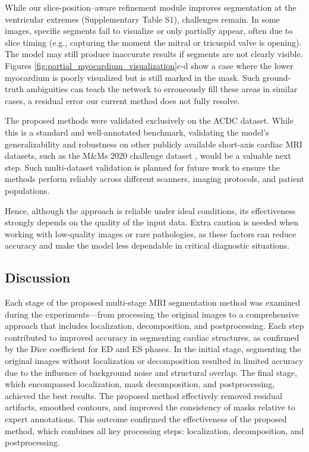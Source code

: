 \documentclass[fleqn,10pt]{wlscirep}
\begin{document}
While our slice-position--aware refinement module improves segmentation at the ventricular extremes (Supplementary Table S1), challenges remain. In some images, specific segments fail to visualize or only partially appear, often due to slice timing (e.g., capturing the moment the mitral or tricuspid valve is opening). The model may still produce inaccurate results if segments are not clearly visible. Figures \ref{fig:partial_myocardium_visualization}c-d show a case where the lower myocardium is poorly visualized but is still marked in the mask. Such ground-truth ambiguities can teach the network to erroneously fill these areas in similar cases, a residual error our current method does not fully resolve.

The proposed methods were validated exclusively on the ACDC dataset. While this is a standard and well-annotated benchmark, validating the model's generalizability and robustness on other publicly available short-axis cardiac MRI datasets, such as the M\&Ms 2020 challenge dataset \cite{Campello:2021}, would be a valuable next step. Such multi-dataset validation is planned for future work to ensure the methods perform reliably across different scanners, imaging protocols, and patient populations.

Hence, although the approach is reliable under ideal conditions, its effectiveness strongly depends on the quality of the input data. Extra caution is needed when working with low-quality images or rare pathologies, as these factors can reduce accuracy and make the model less dependable in critical diagnostic situations.

\subsection*{Discussion}

Each stage of the proposed multi-stage MRI segmentation method was examined during the experiments---from processing the original images to a comprehensive approach that includes localization, decomposition, and postprocessing. Each step contributed to improved accuracy in segmenting cardiac structures, as confirmed by the Dice coefficient for ED and ES phases. In the initial stage, segmenting the original images without localization or decomposition resulted in limited accuracy due to the influence of background noise and structural overlap. The final stage, which encompassed localization, mask decomposition, and postprocessing, achieved the best results. The proposed method effectively removed residual artifacts, smoothed contours, and improved the consistency of masks relative to expert annotations. This outcome confirmed the effectiveness of the proposed method, which combines all key processing steps: localization, decomposition, and postprocessing.
\end{document}
